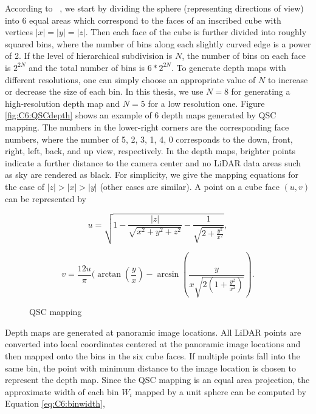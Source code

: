 According to ~\cite{qsc-url}, we start by dividing the sphere (representing directions of view) into $6$ equal areas which correspond to the faces of an inscribed cube with vertices $|x| = |y| = |z|$. Then each face of the cube is further divided into roughly squared bins, where the number of bins along each slightly curved edge is a power of 2. If the level of hierarchical subdivision is $N$, the number of bins on each face is $2^{2N}$ and the total number of bins is $6*2^{2N}$. To generate depth maps with different resolutions, one can simply choose an appropriate value of $N$ to increase or decrease the size of each bin. In this thesis, we use $N=8$ for generating a high-resolution depth map and $N=5$ for a low resolution one. %
Figure \ref{fig:C6:QSCdepth} shows an example of 6 depth maps generated by QSC mapping. The
numbers in the lower-right corners are the corresponding face numbers, %
 where the number of 5, 2, 3, 1, 4, 0 corresponds to the down, front, right, left, back, and up view, respectively. In the depth maps,
brighter points indicate a further distance to the camera center and no LiDAR data areas such as sky are rendered as black. 
For simplicity, we give the mapping equations for the case of $|z| > |x| > |y|$ (other cases are similar). A point on a cube face $(u, v)$ can be represented by

\begin{equation}
u = \sqrt{1- \frac{|z|}{\sqrt{x^2+y^2+z^2}} - \frac{1}{\sqrt{2+ \frac{y^2}{x^2}}}}, 
\label{eq:C6:bmappingU}
\end{equation} 

\begin{equation}
v =  \frac{12u}{\pi}(\arctan(\frac{y}{x}) - \arcsin(\frac{y}{x\sqrt{2(1+\frac{y^2}{x^2})}}).
\label{eq:C6:bmappingV}
\end{equation} 

\begin{figure}[H]
\centering
\caption{QSC mapping} 
\label{fig:C6:QSC1}
\end{figure}

Depth maps are generated at panoramic image locations. All LiDAR points are converted into local coordinates centered at the panoramic image locations and then mapped onto the bins in the six cube faces. If multiple points fall into the same bin, the point with minimum distance to the image location is chosen to represent the depth map. Since the QSC mapping is an equal area projection, the approximate width of each bin $W_i$ mapped by a unit sphere can be computed by Equation \ref{eq:C6:binwidth},

